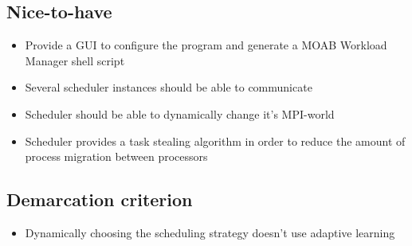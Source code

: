 	\subsection{Nice-to-have}
		\begin{itemize}
			\item Provide a GUI to configure the program and generate a MOAB Workload Manager shell script
			\item Several scheduler instances should be able to communicate
			\item Scheduler should be able to dynamically change it's MPI-world
			\item Scheduler provides a task stealing algorithm in order to reduce the amount of process migration between processors%
		\end{itemize}
	\subsection{Demarcation criterion}
		\begin{itemize}
			\item Dynamically choosing the scheduling strategy doesn't use adaptive learning
		\end{itemize}